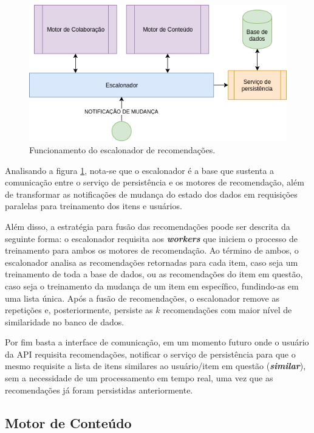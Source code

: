\documentclass[12pt, openright, oneside, a4paper, brazil]{abntex2}
\begin{document}
\begin{figure}[h!tp]
	\caption{\label{scheduler}Funcionamento do escalonador de recomendações.}
	\begin{center}
		\includegraphics[scale=0.8]{images/scheduler.png}
	\end{center}
	\hspace{5.5cm}{Fonte: O Autor.}
\end{figure}

Analisando a figura \ref{scheduler}, nota-se que o escalonador é a base que sustenta a comunicação entre o serviço de persistência e os motores de recomendação, além de transformar as notificações de mudança do estado dos dados em requisições paralelas para treinamento dos itens e usuários.

Além disso, a estratégia para fusão das recomendações poode ser descrita da seguinte forma: o escalonador requisita aos \textbf{\textit{workers}} que iniciem o processo de treinamento para ambos os motores de recomendação. Ao término de ambos, o escalonador analisa as recomendações retornadas para cada item, caso seja um treinamento de toda a base de dados, ou as recomendações do item em questão, caso seja o treinamento da mudança de um item em específico, fundindo-as em uma lista única. Após a fusão de recomendações, o escalonador remove as repetições e, posteriormente, persiste as $k$ recomendações com maior nível de similaridade no banco de dados.

Por fim basta a interface de comunicação, em um momento futuro onde o usuário da API requisita recomendações, notificar o serviço de persistência para que o mesmo requisite a lista de itens similares ao usuário/item em questão (\textbf{\textit{similar}}), sem a necessidade de um processamento em tempo real, uma vez que as recomendações já foram persistidas anteriormente.

\subsection{Motor de Conteúdo} \label{motor:conteudo}
\end{document}
